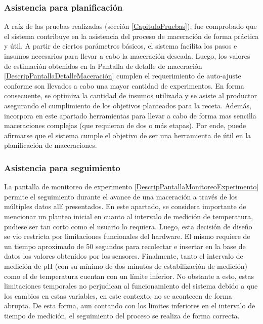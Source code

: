 \subsubsection{Asistencia para planificación} 
\par A raíz de las pruebas realizadas (sección \ref{CapituloPruebas}), fue comprobado que el sistema contribuye en la asistencia del proceso de maceración de forma práctica y útil. A partir de ciertos parámetros básicos, el sistema facilita los pasos e insumos necesarios para llevar a cabo la maceración deseada. Luego, los valores de estimación obtenidos en la Pantalla de detalle de maceración \ref{DescripPantallaDetalleMaceración} cumplen el requerimiento de auto-ajuste conforme son llevados a cabo una mayor cantidad de experimentos. En forma consecuente, se optimiza la cantidad de insumos utilizada y se asiste al productor asegurando el cumplimiento de los objetivos planteados para la receta. Además, incorpora en este apartado herramientas para llevar a cabo de forma mas sencilla maceraciones complejas (que requieran de dos o más etapas). Por ende, puede afirmarse que el sistema cumple el objetivo de ser una herramienta de útil en la planificación de maceraciones.

\subsubsection{Asistencia para seguimiento}
\par La pantalla de monitoreo de experimento \ref{DescripPantallaMonitoreoExperimento} permite el seguimiento durante el avance de una maceración a través de los múltiples datos allí presentados. En este apartado, se considera importante de mencionar un planteo inicial en cuanto al intervalo de medición de temperatura, pudiese ser tan corto como el usuario lo requiera. Luego, esta decisión de diseño se vio restricta por limitaciones funcionales del hardware. El mismo requiere de un tiempo aproximado de 50 segundos para recolectar e insertar en la base de datos los valores obtenidos por los sensores. Finalmente, tanto el intervalo de medición de pH (con su mínimo de dos minutos de estabilización de medición) como el de temperatura cuentan con un límite inferior. No obstante a esto, estas limitaciones temporales no perjudican al funcionamiento del sistema debido a que los cambios en estas variables, en este contexto, no se acontecen de forma abrupta. De esta forma, aun contando con los límites inferiores en el intervalo de tiempo de medición, el seguimiento del proceso se realiza de forma correcta.


